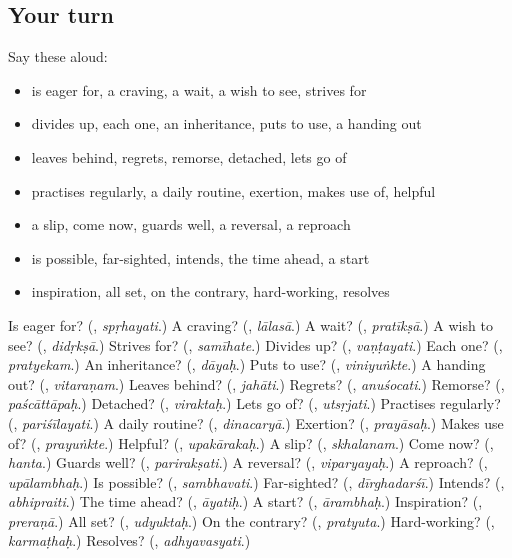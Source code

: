 \subsection*{Your turn}
Say these aloud:

\begin{itemize}
\raggedright
  \item is eager for, a craving, a wait, a wish to see, strives for
  \item divides up, each one, an inheritance, puts to use, a handing out
  \item leaves behind, regrets, remorse, detached, lets go of
  \item practises regularly, a daily routine, exertion, makes use of, helpful
  \item a slip, come now, guards well, a reversal, a reproach
  \item is possible, far-sighted, intends, the time ahead, a start
  \item inspiration, all set, on the contrary, hard-working, resolves
\end{itemize}

\begin{tcolorbox}[breakable,colback=teal!4,colframe=teal!35!black,title={Before you move on}]
Is eager for? (\textbf{}, \emph{spṛhayati}.) A craving? (\textbf{}, \emph{lālasā}.) A wait? (\textbf{}, \emph{pratīkṣā}.) A wish to see? (\textbf{}, \emph{didṛkṣā}.) Strives for? (\textbf{}, \emph{samīhate}.) Divides up? (\textbf{}, \emph{vaṇṭayati}.) Each one? (\textbf{}, \emph{pratyekam}.) An inheritance? (\textbf{}, \emph{dāyaḥ}.) Puts to use? (\textbf{}, \emph{viniyuṅkte}.) A handing out? (\textbf{}, \emph{vitaraṇam}.) Leaves behind? (\textbf{}, \emph{jahāti}.) Regrets? (\textbf{}, \emph{anuśocati}.) Remorse? (\textbf{}, \emph{paścāttāpaḥ}.) Detached? (\textbf{}, \emph{viraktaḥ}.) Lets go of? (\textbf{}, \emph{utsṛjati}.) Practises regularly? (\textbf{}, \emph{pariśīlayati}.) A daily routine? (\textbf{}, \emph{dinacaryā}.) Exertion? (\textbf{}, \emph{prayāsaḥ}.) Makes use of? (\textbf{}, \emph{prayuṅkte}.) Helpful? (\textbf{}, \emph{upakārakaḥ}.) A slip? (\textbf{}, \emph{skhalanam}.) Come now? (\textbf{}, \emph{hanta}.) Guards well? (\textbf{}, \emph{parirakṣati}.) A reversal? (\textbf{}, \emph{viparyayaḥ}.) A reproach? (\textbf{}, \emph{upālambhaḥ}.) Is possible? (\textbf{}, \emph{sambhavati}.) Far-sighted? (\textbf{}, \emph{dīrghadarśī}.) Intends? (\textbf{}, \emph{abhipraiti}.) The time ahead? (\textbf{}, \emph{āyatiḥ}.) A start? (\textbf{}, \emph{ārambhaḥ}.) Inspiration? (\textbf{}, \emph{preraṇā}.) All set? (\textbf{}, \emph{udyuktaḥ}.) On the contrary? (\textbf{}, \emph{pratyuta}.) Hard-working? (\textbf{}, \emph{karmaṭhaḥ}.) Resolves? (\textbf{}, \emph{adhyavasyati}.)
\end{tcolorbox}
